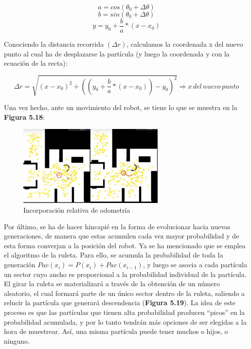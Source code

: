 \begin{equation}
a = cos(\theta_{0} + \Delta\theta)
\end{equation}
\begin{equation}
b = sin(\theta_{0} + \Delta\theta)
\end{equation}
\begin{equation}
y = y_{0} + \dfrac{b}{a} * (x-x_{0})
\end{equation}

Conociendo la distancia recorrida $(\Delta r)$, calculamos la coordenada x del nuevo punto al cual ha de desplazarse la partícula (y luego la coordenada y con la ecuación de la recta):

\begin{equation}
\Delta r = \sqrt{(x-x_{0})^2 + ((y_{0} + \dfrac{b}{a} * (x-x_{0}))-y_{0})^2} \Rightarrow x\, del\, nuevo\, punto
\end{equation}

Una vez hecho, ante un movimiento del robot, se tiene lo que se muestra en la \textbf{Figura 5.18}:

\begin{figure}[H]
\begin{center}
	\includegraphics[width=0.65\textwidth]{figures/movimientoincorporado.png}
	\caption{Incorporación relativa de odometría}
	\label{fig.movimientoincorporado}
	\end{center}
\end{figure}

Por último, se ha de hacer hincapié en la forma de evolucionar hacia nuevas generaciones, de manera que estas acumulen cada vez mayor probabilidad y de esta forma converjan a la posición del robot. Ya se ha mencionado que se emplea el algoritmo de la ruleta. Para ello, se acumula la probabilidad de toda la generación $Pac(x_{i}) = P(x_{i})+Pac(x_{i-1})$, y luego se asocia a cada partícula un sector cuyo ancho es proporcional a la probabilidad individual de la partícula. El girar la ruleta se materializará a través de la obtención de un número aleatorio, el cual formará parte de un único sector dentro de la ruleta, saliendo a relucir la partícula que generará descendencia (\textbf{Figura 5.19}). La idea de este proceso es que las partículas que tienen alta probabilidad producen “picos” en la probabilidad acumulada, y por lo tanto tendrán más opciones de ser elegidas a la hora de muestrear. Así, una misma partícula puede tener muchos o hijos, o ninguno.

